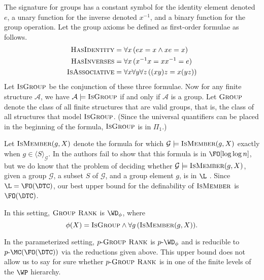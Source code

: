 \documentclass{article}
\newcommand{\dash}{\textnormal{-}}
\newcommand{\pgrouprank}{p\dash\textsc{Group Rank}}
\newcommand{\gen}[1]{\langle#1\rangle}
\begin{document}
\begin{definition}
  The signature for groups has a constant symbol for the identity element denoted $e$, a unary function for the inverse denoted $x^{-1}$, and a binary function for the group operation.
  Let the group axioms be defined as first-order formulae as follows.
  \begin{align*}
    \textsc{HasIdentity} & = \forall x\, (ex = x \land xe = x) \\
    \textsc{HasInverses} & = \forall x\, (x^{-1} x = x x^{-1} = e) \\
    \textsc{IsAssociative} & = \forall x \forall y \forall z\, ((x y) z = x (y z))
  \end{align*}
  Let $\textsc{IsGroup}$ be the conjunction of these three formulae.
  Now for any finite structure $\mathcal{A}$, we have $\mathcal{A} \models \textsc{IsGroup}$ if and only if $\mathcal{A}$ is a group.
  Let $\textsc{Group}$ denote the class of all finite structures that are valid groups, that is, the class of all structures that model $\textsc{IsGroup}$.
  (Since the universal quantifiers can be placed in the beginning of the formula, $\textsc{IsGroup}$ is in $\Pi_1$.)
\end{definition}

Let $\textsc{IsMember}(g, X)$ denote the formula for which $\mathcal{G} \models \textsc{IsMember}(g, X)$ exactly when $g \in \gen{S}_\mathcal{G}$.
In \autocite[Subsection~3.3]{bklm01} the authors fail to show that this formula is in $\FO[\log \log n]$, but we do know that the problem of deciding whether $\mathcal{G} \models \textsc{IsMember}(g, X)$, given a group $\mathcal{G}$, a subset $S$ of $\mathcal{G}$, and a group element $g$, is in $\L$ \autocite[Lemma~3.5]{grouprank}.
Since $\L = \FO(\DTC)$, our best upper bound for the definability of $\textsc{IsMember}$ is $\FO(\DTC)$.

In this setting, $\textsc{Group Rank}$ is $\WD_\phi$, where
\[
\phi(X) = \textsc{IsGroup} \land \forall g\, (\textsc{IsMember}(g, X)).
\]

In the parameterized setting, $\pgrouprank$ is $p\textnormal{-}\WD_\phi$ and is reducible to $p\textnormal{-}\MC(\FO(\DTC))$ via the reductions given above.
This upper bound does not allow us to say for sure whether $\pgrouprank$ is in one of the finite levels of the $\WP$ hierarchy.
\end{document}
